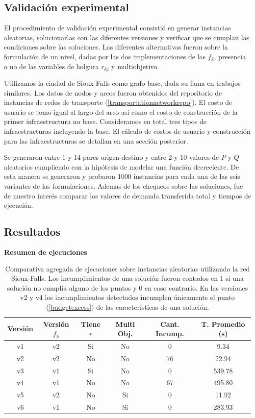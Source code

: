 \documentclass{article}
\begin{document}
  \subsection{Validación experimental}

  El procedimiento de validación experimental consistió en generar instancias aleatorias, solucionarlas con las diferentes versiones y verificar que se cumplan las condiciones sobre las soluciones. Las diferentes alternativas fueron sobre la formulación de un nivel, dadas por las dos implementaciones de las $f_k$, presencia o no de las variables de holgura $r_{kj}$ y multiobjetivo.

  Utilizamos la ciudad de Sioux-Falls como grafo base, dada su fama en trabajos similares. Los datos de nodos y arcos fueron obtenidos del repositorio de instancias de redes de transporte (\ref{transportationnetworkrepo}). El costo de usuario se tomo igual al largo del arco así como el costo de construcción de la primer infraestructura no base. Consideramos en total tres tipos de infraestructuras incluyendo la base. El cálculo de costos de usuario y construcción para las infraestructuras se detallan en una sección posterior.

  Se generaron entre 1 y 14 pares origen-destino y entre 2 y 10 valores de $P$ y $Q$ aleatorios cumpliendo con la hipótesis de modelar una función decreciente.
  De esta manera se generaron y probaron 1000 instancias para cada una de las seis variantes de las formulaciones. Ademas de los chequeos sobre las soluciones, fue de nuestro interés comparar los valores de demanda transferida total y tiempos de ejecución.

  \subsection{Resultados}

  \begin{table}[h!]
    \centering
    \caption*{{\bf Resumen de ejecuciones}}
    \begin{tabular}{cccccc}
      \toprule
      Versión & Versión $f_k$ & Tiene $r$ & Multi Obj. & Cant. Incump. & T. Promedio (s) \\
      \midrule
      v1 & v2 & Si & No & 0   & 9.34    \\
      v2 & v2 & No & No & 76  & 22.94   \\
      v3 & v1 & Si & No & 0   & 539.78  \\
      v4 & v1 & No & No & 67  & 495.80  \\
      v5 & v2 & No & Si & 0   & 11.92   \\
      v6 & v1 & No & Si & 0   & 283.93  \\
      \bottomrule
    \end{tabular}
    \caption{Comparativa agregada de ejecuciones sobre instancias aleatorias utilizando la red Sioux-Falls. Los incumplimientos de una solución fueron contados en 1 si una solución no cumplía alguno de los puntos y 0 en caso contrario. En las versiones v2 y v4 los incumplimientos detectados incumplen únicamente el punto (\ref{budgetexcess}) de las características de una solución.}\label{table:resumenejecuciones}
  \end{table}
\end{document}
